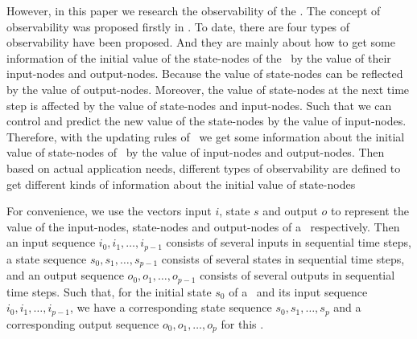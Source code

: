 However, in this paper we research the observability of the \BCNs. The concept of observability was proposed firstly in \cite{cheng2009controllability}. To date, there are four types of observability have been proposed. And they are mainly about how to get some information of the initial value of the state-nodes of the \BCNs\ by the value of their input-nodes and output-nodes. Because the value of state-nodes can be reflected by the value of output-nodes. Moreover, the value of state-nodes at the next time step is affected by the value of state-nodes and input-nodes. Such that we can control and predict the new value of the state-nodes by the value of input-nodes. Therefore, with the updating rules of \BCNs\ we get some information about the initial value of state-nodes of \BCNs\ by the value of input-nodes and output-nodes. Then based on actual application needs, different types of observability are defined to get different kinds of information about the initial value of state-nodes%

For convenience, we use the vectors input $i$, state $s$ and output $o$ to represent the value of the input-nodes, state-nodes and output-nodes of a \BCN\ respectively. Then an input sequence $i_0, i_1,\ldots, i_{p-1}$ consists of several inputs in sequential time steps, a state sequence $s_0, s_1,\ldots, s_{p-1}$ consists of several states in sequential time steps, and an output sequence $o_0, o_1,\ldots, o_{p-1}$ consists of several outputs in sequential time steps. Such that, for the initial state $s_0$ of a \BCN\ and its input sequence $i_0, i_1,\ldots, i_{p-1}$, we have a corresponding state sequence $s_0, s_1,\ldots, s_{p}$ and a corresponding output sequence $o_0, o_1,\ldots, o_{p}$ for this \BCN.

